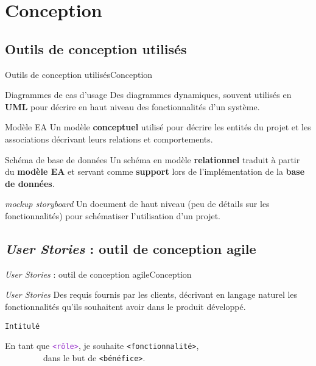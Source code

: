 \documentclass[usenames,dvipsnames]{beamer}
\begin{document}
\section{Conception}
\subsection{Outils de conception utilisés}
\begin{frame}{Outils de conception utilisés}{Conception}
\begin{block}{Diagrammes de cas d'usage}
Des diagrammes dynamiques, souvent utilisés en \textbf{UML} pour décrire en haut niveau des fonctionnalités d'un système.
\end{block}

\begin{block}{Modèle EA}
Un modèle \textbf{conceptuel} utilisé pour décrire les entités du projet et les associations décrivant leurs relations et comportements.
\end{block}

\begin{block}{Schéma de base de données}
Un schéma en modèle \textbf{relationnel} traduit à partir du \textbf{modèle EA} et servant comme \textbf{support} lors de l'implémentation de la \textbf{base de données}.
\end{block}

\begin{block}{\textit{mockup storyboard}}
Un document de haut niveau (peu de détails sur les fonctionnalités) pour schématiser l'utilisation d'un projet.
\end{block}
\end{frame}

\subsection{\protect\textit{User Stories} : outil de conception agile}
\begin{frame}{\textit{User Stories} : outil de conception agile}{Conception}
\begin{block}{\textit{User Stories}}
Des requis fournis par les clients, décrivant en langage naturel les fonctionnalités qu'ils souhaitent avoir dans le produit développé.
\end{block}

\begin{block}{\textcolor{Sepia}{\texttt{Intitulé}}}
\begin{it}
  En tant que \textcolor{DarkOrchid}{\texttt{<rôle>}}, je souhaite \textcolor{BrickRed}{\texttt{<fonctionnalité>}}, \\
  ~~~~~~~~~dans le but de \textcolor{OliveGreen}{\texttt{<bénéfice>}}.
\end{it}
\end{block}
\end{frame}
\end{document}
